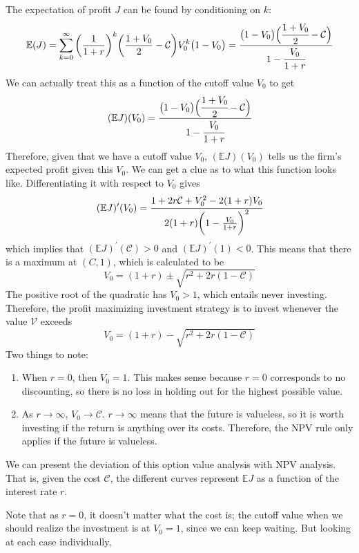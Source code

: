 \documentclass{article}
\begin{document}
      The expectation of profit $J$ can be found by conditioning on $k$: 
      \[\mathbb{E}(J) = \sum_{k = 0}^\infty \bigg(\frac{1}{1+r}\bigg)^k \bigg( \frac{1 + V_0}{2} - \mathcal{C}\bigg) V_0^k \big(1 - V_0\big) = \cfrac{\big(1 - V_0\big) \Big(\cfrac{1+V_0}{2} - \mathcal{C}\Big)}{1 - \cfrac{V_0}{1+r}}\]
      We can actually treat this as a function of the cutoff value $V_0$ to get 
      \[( \mathbb{E} J)(V_0) = \cfrac{\big(1 - V_0\big) \Big(\cfrac{1+V_0}{2} - \mathcal{C}\Big)}{1 - \cfrac{V_0}{1+r}}\]
      Therefore, given that we have a cutoff value $V_0$, $(\mathbb{E} J) (V_0)$ tells us the firm's expected profit given this $V_0$. We can get a clue as to what this function looks like. Differentiating it with respect to $V_0$ gives 
      \[( \mathbb{E} J)^\prime (V_0) = \cfrac{1 + 2r \mathcal{C} + V_0^2 - 2(1+r) V_0}{2 (1+r) \bigg( 1 - \frac{V_0}{1+r}\bigg)^2}\]  
      which implies that $(\mathbb{E} J)^\prime (\mathcal{C}) > 0$ and $(\mathbb{E}J)^\prime (1) < 0$. This means that there is a maximum at $(C, 1)$, which is calculated to be
      \[V_0 = (1 + r) \pm \sqrt{r^2 + 2r (1-\mathcal{C})}\]
      The positive root of the quadratic has $V_0 > 1$, which entails never investing. Therefore, the profit maximizing investment strategy is to invest whenever the value $\mathcal{V}$ exceeds 
      \[V_0 = (1 + r) - \sqrt{r^2 + 2r (1-\mathcal{C})}\]
      Two things to note: 
      \begin{enumerate}
        \item When $r=0$, then $V_0 = 1$. This makes sense because $r=0$ corresponds to no discounting, so there is no loss in holding out for the highest possible value. 
        \item As $r \rightarrow \infty$, $V_0 \rightarrow \mathcal{C}$. $r \rightarrow \infty$ means that the future is valueless, so it is worth investing if the return is anything over its costs. Therefore, the NPV rule only applies if the future is valueless. 
      \end{enumerate}
      We can present the deviation of this option value analysis with NPV analysis. That is, given the cost $\mathcal{C}$, the different curves represent $\mathbb{E} J$ as a function of the interest rate $r$. 
      \begin{center}
      \end{center}
      Note that as $r = 0$, it doesn't matter what the cost is; the cutoff value when we should realize the investment is at $V_0 = 1$, since we can keep waiting. But looking at each case individually, 
\end{document}
